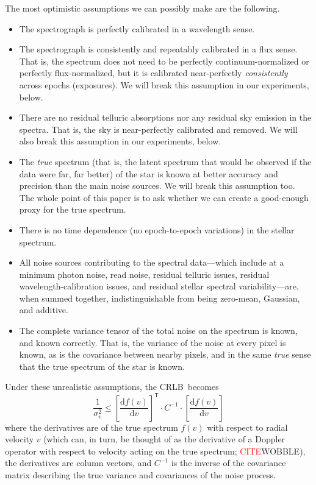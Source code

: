 \documentclass[modern]{aastex631}
\newcommand{\dd}{\mathrm{d}}
\newcommand{\T}{^{\mathsf{T}}}
\newcommand{\todo}[1]{\textcolor{red}{#1}}  %
\newcommand{\CITE}{\todo{CITE}}
\newcommand{\acronym}[1]{{\small{#1}}}
\newcommand{\CRLB}{\acronym{CRLB}}
\begin{document}
The most optimistic assumptions we can possibly make are the following.
\begin{itemize}
\item The spectrograph is perfectly calibrated in a wavelength sense.
\item The spectrograph is consistently and repeatably calibrated in a
  flux sense. That is, the spectrum does not need to be perfectly
  continuum-normalized or perfectly flux-normalized, but it is
  calibrated near-perfectly \emph{consistently} across epochs (exposures).
  We will break this assumption in our experiments, below.
\item There are no residual telluric absorptions nor any residual sky
  emission in the spectra. That is, the sky is near-perfectly calibrated
  and removed.
  We will also break this assumption in our experiments, below.
\item The \emph{true} spectrum (that is, the latent spectrum that
  would be observed if the data were far, far better) of the star is
  known at better accuracy and precision than the main noise sources.
  We will break this assumption too.
  The whole point of this paper is to ask whether we can create a
  good-enough proxy for the true spectrum.
\item There is no time dependence (no epoch-to-epoch variations) in the
  stellar spectrum.
\item All noise sources contributing to the spectral data---which
  include at a minimum photon noise, read noise, residual telluric
  issues, residual wavelength-calibration issues, and residual stellar
  spectral variability---are, when summed together, indistinguishable
  from being zero-mean, Gaussian, and additive.
\item The complete variance tensor of the total noise on the spectrum is known, and
  known correctly. That is, the variance of the noise at every pixel
  is known, as is the covariance between nearby pixels, and in the
  same \emph{true} sense that the true spectrum of the star is known.
\end{itemize}
Under these unrealistic assumptions, the \CRLB\ becomes
\begin{equation}\label{eq:crlb}
\frac{1}{\sigma_v^2} \leq \left[\frac{\dd f(v)}{\dd v}\right]\T\cdot C^{-1}\cdot\left[\frac{\dd f(v)}{\dd v}\right]
\end{equation}
where the derivatives are of the true spectrum $f(v)$ with respect to
radial velocity $v$ (which can, in turn, be thought of as the derivative of a Doppler
operator with respect to velocity acting on the true spectrum; \CITE WOBBLE), the
derivatives are column vectors, and $C^{-1}$ is the inverse of the covariance matrix
describing the true variance and covariances of the noise process.
\end{document}
